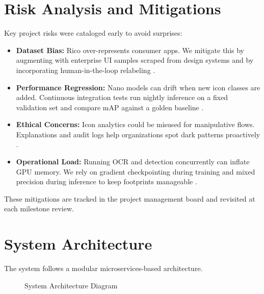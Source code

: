 \documentclass[11pt,a4paper]{report}
\begin{document}
\section{Risk Analysis and Mitigations}
Key project risks were cataloged early to avoid surprises:
\begin{itemize}
    \item \textbf{Dataset Bias:} Rico over-represents consumer apps. We mitigate this by augmenting with enterprise UI samples scraped from design systems and by incorporating human-in-the-loop relabeling \cite{rico}.
    \item \textbf{Performance Regression:} Nano models can drift when new icon classes are added. Continuous integration tests run nightly inference on a fixed validation set and compare mAP against a golden baseline \cite{yolov11}.
    \item \textbf{Ethical Concerns:} Icon analytics could be misused for manipulative flows. Explanations and audit logs help organizations spot dark patterns proactively \cite{darkpatterns}.
    \item \textbf{Operational Load:} Running OCR and detection concurrently can inflate GPU memory. We rely on gradient checkpointing during training and mixed precision during inference to keep footprints manageable \cite{pytorch}.
\end{itemize}
These mitigations are tracked in the project management board and revisited at each milestone review.

\section{System Architecture}
The system follows a modular microservices-based architecture.

\begin{figure}[H]
    \centering
    \caption{System Architecture Diagram}
    \label{fig:architecture}
\end{figure}
\end{document}
